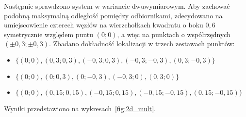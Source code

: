Następnie sprawdzono system w wariancie dwuwymiarowym. Aby zachować podobną maksymalną odległość pomiędzy odbiornikami, zdecydowano na umiejscowienie czterech węzłów na wierzchołkach kwadratu o boku $0,6$ symetrycznie względem puntu $(0;0)$, a więc na punktach o współrzędnych $(\pm0,3; \pm0,3)$. Zbadano dokładność lokalizacji w trzech zestawach punktów:

\begin{itemize}
    \item $\{(0;0), (0,3;0,3), (-0,3;0,3), (-0,3;-0,3), (0,3;-0,3)\}$
    \item $\{(0;0), (0;0,3), (0;-0,3), (-0,3;0), (0,3;0)\}$
    \item $\{(0;0), (0,15;0,15), (-0,15;0,15), (-0,15;-0,15), (0,15;-0,15)\}$
\end{itemize}
Wyniki przedstawiono na wykresach~\ref{fig:2d_mult}.

